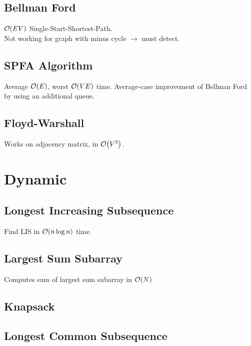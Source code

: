 \documentclass[landscape,8pt]{article}
\begin{document}
\begin{multicols}{2}
  \subsection{Bellman Ford}
    $\order{EV}$ Single-Start-Shortest-Path.\\
    Not working for graph with minus cycle $\rightarrow$ must detect.
      
  \subsection{SPFA Algorithm}
    Average $\order{E}$, worst $\order{VE}$ time. Average-case improvement of Bellman Ford by using an additional queue.

  \subsection{Floyd-Warshall}
    Works on adjacency matrix, in $\order{V^3}$.
      

\columnbreak

\section{Dynamic}
  \subsection{Longest Increasing Subsequence}
    Find LIS in $\order{n \log n}$ time.
      

  \subsection{Largest Sum Subarray}
    Computes sum of largest sum subarray in $\order{N}$
      

  \subsection{Knapsack}

  \subsection{Longest Common Subsequence}
    


\end{multicols}
\end{document}
